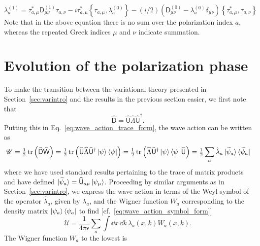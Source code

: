 %
\begin{equation}
  \boxed{
  \lambda^{(1)}_{a} = \tau_{a,\mu}^{*}\mathsf{D}_{\mu\nu}^{(1)}\tau_{a,\nu} - i\tau_{a,\mu}^{*}\left\{\tau_{a,\mu}, \lambda^{(0)}_{a}\right\} - (i/2)\left(\mathsf{D}^{(0)}_{\mu\nu} - \lambda^{(0)}_{a}\delta_{\mu\nu}\right)\left\{\tau_{a,\mu}^{*}, \tau_{a,\nu}\right\}}
  \label{eq:lambda1}
\end{equation}
%
Note that in the above equation there is no sum over the polarization index $a$, whereas the repeated Greek indices $\mu$ and $\nu$ indicate summation.

\section{Evolution of the polarization phase}

To make the transition between the variational theory presented in Section~\ref{sec:varintro} and the results in the previous section easier, we first note that
%
\begin{equation}
  \widehat{\mathsf{D}} = \widehat{\mathsf{U}}\widehat{\Lambda}\widehat{\mathsf{U}}^{\dagger}.
\end{equation}
%
Putting this in Eq.~\eqref{eq:wave_action_trace_form}, the wave action can be written as
%
\begin{equation}
  \mathscr{U} = \tfrac{1}{2}\operatorname{tr}\left(\widehat{\mathsf{D}}\widehat{\mathsf{W}}\right) = \tfrac{1}{2}\operatorname{tr}\left(\widehat{\mathsf{U}}\widehat{\Lambda}\widehat{\mathsf{U}}^{\dagger}\mathinner{\lvert{\psi}\rangle}\mathinner{\langle{\psi}\rvert}\right) = \tfrac{1}{2}\operatorname{tr}\left(\widehat{\Lambda}\widehat{\mathsf{U}}^{\dagger}\mathinner{\lvert{\psi}\rangle}\mathinner{\langle{\psi}\rvert}\widehat{\mathsf{U}}\right)
  = \tfrac{1}{2}\sum_{a} \hat{\lambda}_{a}\mathinner{\lvert{\widetilde{\psi}_{a}}\rangle}\mathinner{\langle{\widetilde{\psi}_{a}}\rvert}
\end{equation}
%
where we have used standard results pertaining to the trace of matrix products and have defined $\mathinner{\lvert{\widetilde{\psi}_{a}}\rangle} = \widehat{\mathsf{U}}_{a\mu}\mathinner{\lvert{\psi_{\mu}}\rangle}$.
Proceeding by similar arguments as in Section~\ref{sec:varintro}, we express the wave action in terms of the Weyl symbol of the operator $\hat{\lambda}_{a}$, given by $\lambda_{a}$,  and the Wigner function $W_{a}$ corresponding to the density matrix $\mathinner{\lvert{\psi_{a}}\rangle}\mathinner{\langle{\psi_{a}}\rvert}$ to find [cf.~\eqref{eq:wave_action_symbol_form}]
%
\begin{equation}
  \mathscr{U} = \frac{1}{4\pi\epsilon}\sum_{a}\int \dd{x}\,\dd{k}\, \lambda_{a}(x, k) W_{a}(x, k).
\end{equation}
%
The Wigner function $W_{a}$ to the lowest is
